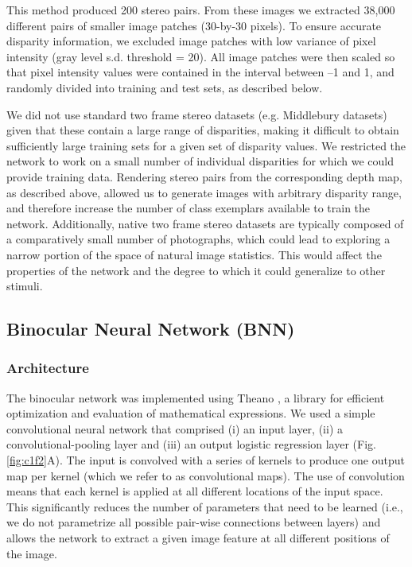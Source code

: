 This method produced 200 stereo pairs. From these images we extracted 38,000 different pairs of smaller image patches (30-by-30 pixels). To ensure accurate disparity information, we excluded image patches with low variance of pixel intensity (gray level s.d. threshold = 20). All image patches were then scaled so that pixel intensity values were contained in the interval between --1 and 1, and randomly divided into training and test sets, as described below. 

We did not use standard two frame stereo datasets (e.g. Middlebury datasets) given that these contain a large range of disparities, making it difficult to obtain sufficiently large training sets for a given set of disparity values. We restricted the network to work on a small number of individual disparities for which we could provide training data. Rendering stereo pairs from the corresponding depth map, as described above, allowed us to generate images with arbitrary disparity range, and therefore increase the number of class exemplars available to train the network. Additionally, native two frame stereo datasets are typically composed of a comparatively small number of photographs, which could lead to exploring a narrow portion of the space of natural image statistics. This would affect the properties of the network and the degree to which it could generalize to other stimuli. 

\subsection*{Binocular Neural Network (BNN)}

\subsubsection*{Architecture}

The binocular network was implemented using Theano \cite{2016arXiv160502688T}, a library for efficient optimization and evaluation of mathematical expressions. We used a simple convolutional neural network that comprised (i) an input layer, (ii) a convolutional-pooling layer and (iii) an output logistic regression layer (Fig. \ref{fig:c1f2}A). The input is convolved with a series of kernels to produce one output map per kernel (which we refer to as convolutional maps). The use of convolution means that each kernel is applied at all different locations of the input space. This significantly reduces the number of parameters that need to be learned (i.e., we do not parametrize all possible pair-wise connections between layers) and allows the network to extract a given image feature at all different positions of the image. 

